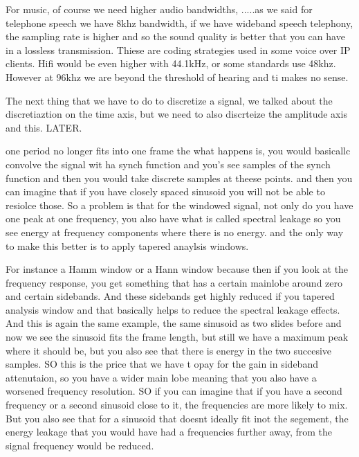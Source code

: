  For music, of course we need higher audio bandwidths,  .....as we said for telephone speech we have 8khz bandwidth, if we have wideband speech telephony, the sampling rate is higher and so the sound quality is better that you can have in a lossless transmission.  Thiese are coding strategies used in some voice over IP clients.  Hifi would be even higher with 44.1kHz, or some standards use 48khz. However at 96khz we are beyond the threshold of hearing and ti makes no sense. 
 
 The next thing that we have to do to discretize a signal, we talked about the discretiaztion on the time axis, but we need to also discrteize the amplitude axis and this.  LATER.
 
 one period no longer fits into one frame  the what happens is, you would basicallc convolve the signal wit ha synch function and you's see samples of the synch function and then you would take discrete samples at theese points.  and then you can imagine that if you have closely spaced sinusoid you will not be able to resiolce those. So a problem is that for the windowed signal, not only do you have one peak at one frequency, you also have what is called spectral leakage so you see energy at frequency components where there is no energy.  and the only way to make this better is to apply tapered anaylsis windows.

For instance a Hamm window or a Hann window because then if you look at the frequency response, you get something that has a certain mainlobe around zero and certain sidebands.  And these sidebands get highly reduced if you tapered analysis window and that basically helps to reduce the spectral leakage effects.  And this is again the same example, the same sinusoid as two slides before and now we see the sinusoid fits the frame length, but still we have a maximum peak where it should be, but you also see that there is energy in the two succesive samples.  SO this is the price that we have t opay for the gain in sideband attenutaion, so you have a wider main lobe meaning that you also have a worsened frequency resolution. SO if you can imagine that if you have a second frequency or a second sinusoid close to it, the frequencies are more likely to mix. But you also see that for a sinusoid that doesnt ideally fit inot the segement, the energy leakage that you would have had a frequencies further away, from the signal frequency would be reduced. 



